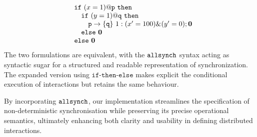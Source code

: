 \begin{itemize}
  \begin{displaymath}
    \begin{array}{ll}
      & \mathtt{if}\ (x=1)@\mathtt{p}\ \mathtt{then}\\
      & \quad \mathtt{if}\ (y=1)@\mathtt{q}\ \mathtt{then}\\
      & \quad \quad \mathtt{p}\rightarrow \{\mathtt{q}\}\ 1 : (x'=100)\&(y'=0);\mathbf{0} \\
      & \quad \mathtt{else}\ \mathbf{0} \\
      & \mathtt{else}\ \mathbf{0}
    \end{array}
  \end{displaymath}
  The two formulations are equivalent, with the $\mathtt{allsynch}$ syntax
  acting as syntactic sugar for a structured and readable
  representation of synchronization. The expanded version using
  $\mathtt{if\text{-}then\text{-}else}$ makes explicit the conditional
  execution of interactions but retains the same behaviour.

  By incorporating $\mathtt{allsynch}$, our implementation streamlines the
  specification of non-deterministic synchronisation while preserving
  its precise operational semantics, ultimately enhancing both clarity
  and usability in defining distributed interactions.
\end{itemize}

  



